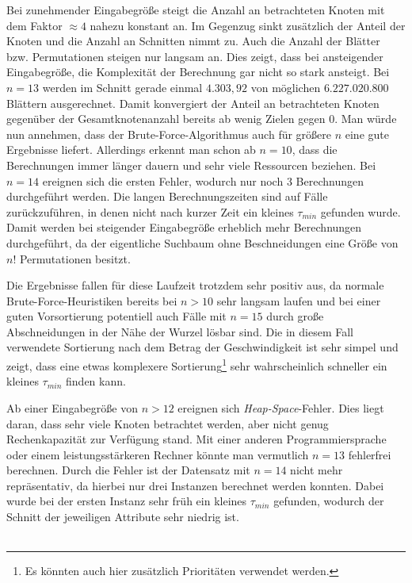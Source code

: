 \documentclass[german,version-2019-11]{uzl-thesis}
\begin{document}
Bei zunehmender Eingabegröße steigt die Anzahl an betrachteten Knoten mit dem Faktor $\approx 4$ nahezu konstant an. Im Gegenzug sinkt zusätzlich der Anteil der Knoten und die Anzahl an Schnitten nimmt zu. Auch die Anzahl der Blätter bzw. Permutationen steigen nur langsam an. Dies zeigt, dass bei ansteigender Eingabegröße, die Komplexität der Berechnung gar nicht so stark ansteigt. Bei $n=13$ werden im Schnitt gerade einmal $4.303,92$ von möglichen $6.227.020.800$ Blättern ausgerechnet. Damit konvergiert der Anteil an betrachteten Knoten gegenüber der Gesamtknotenanzahl bereits ab wenig Zielen gegen $0$. Man würde nun annehmen, dass der Brute-Force-Algorithmus auch für größere $n$ eine gute Ergebnisse liefert. Allerdings erkennt man schon ab $n=10$, dass die Berechnungen immer länger dauern und sehr viele Ressourcen beziehen. Bei $n=14$ ereignen sich die ersten Fehler, wodurch nur noch $3$ Berechnungen durchgeführt werden. Die langen Berechnungszeiten sind auf Fälle zurückzuführen, in denen nicht nach kurzer Zeit ein kleines $\tau_{min}$ gefunden wurde. Damit werden bei steigender Eingabegröße erheblich mehr Berechnungen durchgeführt, da der eigentliche Suchbaum ohne Beschneidungen eine Größe von $n!$ Permutationen besitzt.  

Die Ergebnisse fallen für diese Laufzeit trotzdem sehr positiv aus, da normale Brute-Force-Heuristiken bereits bei $n>10$ sehr langsam laufen und bei einer guten Vorsortierung potentiell auch Fälle mit $n=15$ durch große Abschneidungen in der Nähe der Wurzel lösbar sind. Die in diesem Fall verwendete Sortierung nach dem Betrag der Geschwindigkeit ist sehr simpel und zeigt, dass eine etwas komplexere Sortierung\footnote{Es könnten auch hier zusätzlich Prioritäten verwendet werden.} sehr wahrscheinlich schneller ein kleines $\tau_{min}$ finden kann. 

Ab einer Eingabegröße von $n>12$ ereignen sich \emph{Heap-Space}-Fehler. Dies liegt daran, dass sehr viele Knoten betrachtet werden, aber nicht genug Rechenkapazität zur Verfügung stand. Mit einer anderen Programmiersprache oder einem leistungsstärkeren Rechner könnte man vermutlich $n=13$ fehlerfrei berechnen. Durch die Fehler ist der Datensatz mit $n=14$ nicht mehr repräsentativ, da hierbei nur drei Instanzen berechnet werden konnten. Dabei wurde bei der ersten Instanz sehr früh ein kleines $\tau_{min}$ gefunden, wodurch der Schnitt der jeweiligen Attribute sehr niedrig ist.   \\~\\
\end{document}
